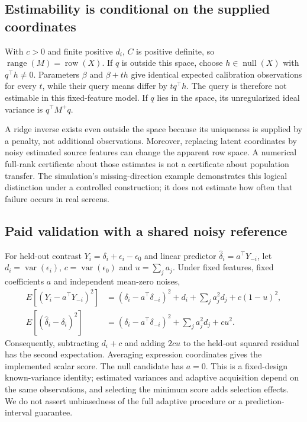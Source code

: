 \subsection{Estimability is conditional on the supplied coordinates}
With $c>0$ and finite positive $d_i$, $C$ is positive definite, so $\operatorname{range}(M)=\operatorname{row}(X)$. If $q$ is outside this space, choose $h\in\operatorname{null}(X)$ with $q^\top h\ne0$. Parameters $\beta$ and $\beta+th$ give identical expected calibration observations for every $t$, while their query means differ by $tq^\top h$. The query is therefore not estimable in this fixed-feature model. If $q$ lies in the space, its unregularized ideal variance is $q^\top M^+q$.

A ridge inverse exists even outside the space because its uniqueness is supplied by a penalty, not additional observations. Moreover, replacing latent coordinates by noisy estimated source features can change the apparent row space. A numerical full-rank certificate about those estimates is not a certificate about population transfer. The simulation's missing-direction example demonstrates this logical distinction under a controlled construction; it does not estimate how often that failure occurs in real screens.

\subsection{Paid validation with a shared noisy reference}
For held-out contrast $Y_i=\delta_i+\epsilon_i-\epsilon_0$ and linear predictor $\widehat\delta_i=a^\top Y_{-i}$, let $d_i=\operatorname{var}(\epsilon_i)$, $c=\operatorname{var}(\epsilon_0)$ and $u=\sum_j a_j$. Under fixed features, fixed coefficients $a$ and independent mean-zero noises,
\begin{align}
 E[(Y_i-a^\top Y_{-i})^2]
 &= (\delta_i-a^\top\delta_{-i})^2+d_i+\sum_j a_j^2d_j+c(1-u)^2,\\
 E[(\widehat\delta_i-\delta_i)^2]
 &= (\delta_i-a^\top\delta_{-i})^2+\sum_j a_j^2d_j+cu^2.
\end{align}
Consequently, subtracting $d_i+c$ and adding $2cu$ to the held-out squared residual has the second expectation. Averaging expression coordinates gives the implemented scalar score. The null candidate has $a=0$. This is a fixed-design known-variance identity; estimated variances and adaptive acquisition depend on the same observations, and selecting the minimum score adds selection effects. We do not assert unbiasedness of the full adaptive procedure or a prediction-interval guarantee.

